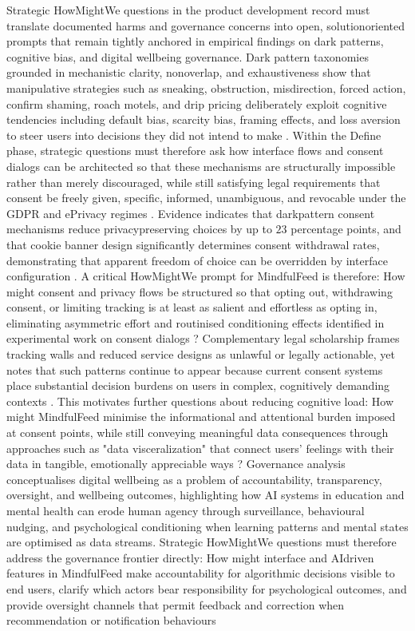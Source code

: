\documentclass{article}
\begin{document}
\label{sec:strategic_how_might_we} Strategic How\-Might\-We questions in the product development record must translate documented harms and governance concerns into open, solution\-oriented prompts that remain tightly anchored in empirical findings on dark patterns, cognitive bias, and digital well\-being governance. Dark pattern taxonomies grounded in mechanistic clarity, non\-overlap, and exhaustiveness show that manipulative strategies such as sneaking, obstruction, misdirection, forced action, confirm shaming, roach motels, and drip pricing deliberately exploit cognitive tendencies including default bias, scarcity bias, framing effects, and loss aversion to steer users into decisions they did not intend to make \parencites[2]{5127387}[2]{4807303}. Within the Define phase, strategic questions must therefore ask how interface flows and consent dialogs can be architected so that these mechanisms are structurally impossible rather than merely discouraged, while still satisfying legal requirements that consent be freely given, specific, informed, unambiguous, and revocable under the GDPR and ePrivacy regimes \parencites[4]{5678011}[2]{4807303}. Evidence indicates that dark\-pattern consent mechanisms reduce privacy\-preserving choices by up to $23$ percentage points, and that cookie banner design significantly determines consent withdrawal rates, demonstrating that apparent freedom of choice can be overridden by interface configuration \parencites[2]{4807303}. A critical How\-Might\-We prompt for MindfulFeed is therefore: How might consent and privacy flows be structured so that opting out, withdrawing consent, or limiting tracking is at least as salient and effortless as opting in, eliminating asymmetric effort and routinised conditioning effects identified in experimental work on consent dialogs \parencites[2]{4807303}[14]{5678011}? Complementary legal scholarship frames tracking walls and reduced service designs as unlawful or legally actionable, yet notes that such patterns continue to appear because current consent systems place substantial decision burdens on users in complex, cognitively demanding contexts \parencites[4]{5678011}[15]{5678011}. This motivates further questions about reducing cognitive load: How might MindfulFeed minimise the informational and attentional burden imposed at consent points, while still conveying meaningful data consequences through approaches such as "data visceralization" that connect users' feelings with their data in tangible, emotionally appreciable ways \parencites[15]{5678011}? Governance analysis conceptualises digital well\-being as a problem of accountability, transparency, oversight, and well\-being outcomes, highlighting how AI systems in education and mental health can erode human agency through surveillance, behavioural nudging, and psychological conditioning when learning patterns and mental states are optimised as data streams. Strategic How\-Might\-We questions must therefore address the governance frontier directly: How might interface and AI\-driven features in MindfulFeed make accountability for algorithmic decisions visible to end users, clarify which actors bear responsibility for psychological outcomes, and provide oversight channels that permit feedback and correction when recommendation or notification behaviours 
\end{document}
